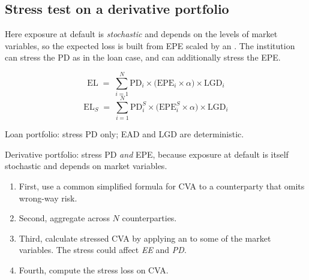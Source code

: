 \subsection*{Stress test on a derivative portfolio}

Here exposure at default is \emph{stochastic} and depends on the levels of market
variables, so the expected loss is built from EPE scaled by an . The institution can stress the PD as in the loan case, and can
additionally stress the EPE.

\begin{crfmlbox}
\[ \mathrm{EL} \;=\; \sum_{i=1}^{N} \mathrm{PD}_i \times
   \bigl(\mathrm{EPE}_i \times \alpha\bigr)\times \mathrm{LGD}_i \]
\[ \mathrm{EL}_S \;=\; \sum_{i=1}^{N} \mathrm{PD}_i^{S} \times
   \bigl(\mathrm{EPE}_i^{S} \times \alpha\bigr)\times \mathrm{LGD}_i \]
\end{crfmlbox}

\begin{crtrapbox}
Loan portfolio: stress PD only; EAD and LGD are deterministic.

\smallskip
Derivative portfolio: stress PD \emph{and} EPE, because exposure at default is
itself stochastic and depends on market variables.
\end{crtrapbox}


\begin{enumerate}
\item First, use a common simplified formula for CVA to a counterparty that omits
wrong-way risk.
\item Second, aggregate across $N$ counterparties.
\item Third, calculate stressed CVA by applying an  to
some of the market variables. The stress could affect \emph{EE} and \emph{PD}.
\item Fourth, compute the stress loss on CVA.
\end{enumerate}

